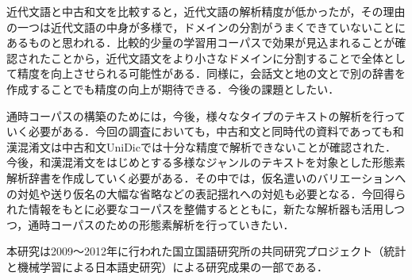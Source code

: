 \documentclass[japanese]{jnlp_1.4}
\begin{document}
近代文語と中古和文を比較すると，近代文語の解析精度が低かったが，その理由の一つは近代文語の中身が多様で，ドメインの分割がうまくできていないことにあるものと思われる．比較的少量の学習用コーパスで効果が見込まれることが確認されたことから，近代文語文をより小さなドメインに分割することで全体として精度を向上させられる可能性がある．同様に，会話文と地の文とで別の辞書を作成することでも精度の向上が期待できる．今後の課題としたい．

通時コーパスの構築のためには，今後，様々なタイプのテキストの解析を行っていく必要がある．今回の調査においても，中古和文と同時代の資料であっても和漢混淆文は中古和文UniDicでは十分な精度で解析できないことが確認された．今後，和漢混淆文をはじめとする多様なジャンルのテキストを対象とした形態素解析辞書を作成していく必要がある．その中では，仮名遣いのバリエーションへの対処や送り仮名の大幅な省略などの表記揺れへの対処も必要となる．今回得られた情報をもとに必要なコーパスを整備するとともに，新たな解析器も活用しつつ，通時コーパスのための形態素解析を行っていきたい．


\acknowledgment

本研究は2009〜2012年に行われた国立国語研究所の共同研究プロジェクト（統計と機械学習による日本語史研究）による研究成果の一部である．
\end{document}
